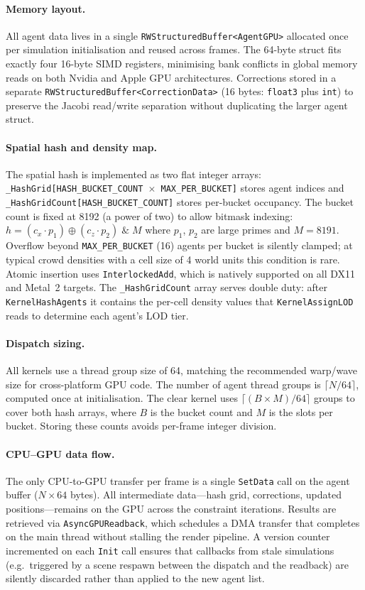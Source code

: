 \paragraph{Memory layout.}
All agent data lives in a single \texttt{RWStructuredBuffer<AgentGPU>}
allocated once per simulation initialisation and reused across frames.  The
64-byte struct fits exactly four 16-byte SIMD registers, minimising bank
conflicts in global memory reads on both Nvidia and Apple GPU architectures.
Corrections stored in a separate \texttt{RWStructuredBuffer<CorrectionData>}
(16 bytes: \texttt{float3} plus \texttt{int}) to preserve the Jacobi
read/write separation without duplicating the larger agent struct.

\paragraph{Spatial hash and density map.}
The spatial hash is implemented as two flat integer arrays:
\texttt{\_HashGrid[HASH\_BUCKET\_COUNT $\times$ MAX\_PER\_BUCKET]} stores
agent indices and \texttt{\_HashGridCount[HASH\_BUCKET\_COUNT]} stores
per-bucket occupancy.  The bucket count is fixed at 8192 (a power of two) to
allow bitmask indexing: $h = (c_x \cdot p_1) \oplus (c_z \cdot p_2) \;\&\;
M$ where $p_1$, $p_2$ are large primes and $M = 8191$.  Overflow beyond
\texttt{MAX\_PER\_BUCKET} (16) agents per bucket is silently clamped; at
typical crowd densities with a cell size of 4 world units this condition is
rare.  Atomic insertion uses \texttt{InterlockedAdd}, which is natively
supported on all DX11 and Metal~2 targets.  The \texttt{\_HashGridCount}
array serves double duty: after \texttt{KernelHashAgents} it contains the
per-cell density values that \texttt{KernelAssignLOD} reads to determine each
agent's LOD tier.

\paragraph{Dispatch sizing.}
All kernels use a thread group size of 64, matching the recommended warp/wave
size for cross-platform GPU code.  The number of agent thread groups is
$\lceil N/64 \rceil$, computed once at initialisation.  The clear kernel uses
$\lceil (B \times M)/64 \rceil$ groups to cover both hash arrays, where $B$
is the bucket count and $M$ is the slots per bucket.  Storing these counts
avoids per-frame integer division.

\paragraph{CPU--GPU data flow.}
The only CPU-to-GPU transfer per frame is a single \texttt{SetData} call on
the agent buffer ($N \times 64$ bytes).  All intermediate data---hash grid,
corrections, updated positions---remains on the GPU across the constraint
iterations.  Results are retrieved via \texttt{AsyncGPUReadback}, which
schedules a DMA transfer that completes on the main thread without stalling
the render pipeline.  A version counter incremented on each \texttt{Init}
call ensures that callbacks from stale simulations (e.g.\ triggered by a
scene respawn between the dispatch and the readback) are silently discarded
rather than applied to the new agent list.

